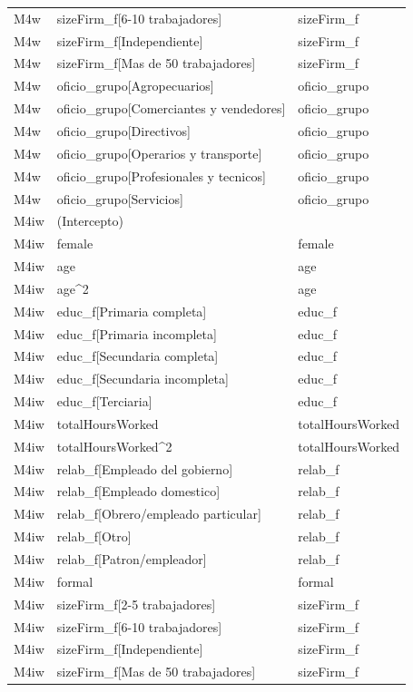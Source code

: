 \begin{longtable}{lll}
M4w & sizeFirm\_f[6-10 trabajadores] & sizeFirm\_f \\
M4w & sizeFirm\_f[Independiente] & sizeFirm\_f \\
M4w & sizeFirm\_f[Mas de 50 trabajadores] & sizeFirm\_f \\
M4w & oficio\_grupo[Agropecuarios] & oficio\_grupo \\
M4w & oficio\_grupo[Comerciantes y vendedores] & oficio\_grupo \\
M4w & oficio\_grupo[Directivos] & oficio\_grupo \\
M4w & oficio\_grupo[Operarios y transporte] & oficio\_grupo \\
M4w & oficio\_grupo[Profesionales y tecnicos] & oficio\_grupo \\
M4w & oficio\_grupo[Servicios] & oficio\_grupo \\
M4iw & (Intercepto) &  \\
M4iw & female & female \\
M4iw & age & age \\
M4iw & age\textasciicircum 2 & age \\
M4iw & educ\_f[Primaria completa] & educ\_f \\
M4iw & educ\_f[Primaria incompleta] & educ\_f \\
M4iw & educ\_f[Secundaria completa] & educ\_f \\
M4iw & educ\_f[Secundaria incompleta] & educ\_f \\
M4iw & educ\_f[Terciaria] & educ\_f \\
M4iw & totalHoursWorked & totalHoursWorked \\
M4iw & totalHoursWorked\textasciicircum 2 & totalHoursWorked \\
M4iw & relab\_f[Empleado del gobierno] & relab\_f \\
M4iw & relab\_f[Empleado domestico] & relab\_f \\
M4iw & relab\_f[Obrero/empleado particular] & relab\_f \\
M4iw & relab\_f[Otro] & relab\_f \\
M4iw & relab\_f[Patron/empleador] & relab\_f \\
M4iw & formal & formal \\
M4iw & sizeFirm\_f[2-5 trabajadores] & sizeFirm\_f \\
M4iw & sizeFirm\_f[6-10 trabajadores] & sizeFirm\_f \\
M4iw & sizeFirm\_f[Independiente] & sizeFirm\_f \\
M4iw & sizeFirm\_f[Mas de 50 trabajadores] & sizeFirm\_f \\

\end{longtable}

